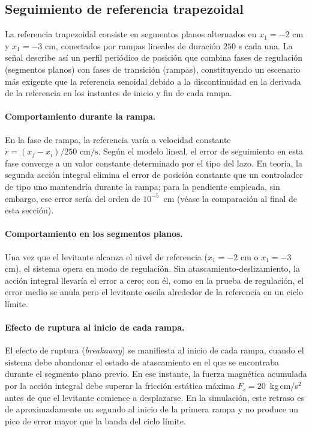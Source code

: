 \FloatBarrier

\subsection{Seguimiento de referencia trapezoidal}

La referencia trapezoidal consiste en segmentos planos alternados en $x_1 = -2$ cm y
$x_1 = -3$ cm, conectados por rampas lineales de duración $250$ s cada una.
La señal describe así un perfil periódico de posición que combina fases de regulación
(segmentos planos) con fases de transición (rampas), constituyendo un escenario más exigente
que la referencia senoidal debido a la discontinuidad en la derivada de la referencia en los
instantes de inicio y fin de cada rampa.

\paragraph{Comportamiento durante la rampa.}
En la fase de rampa, la referencia varía a velocidad constante
$\dot{r} = (x_{f}-x_{i})/250 \text{ cm/s}$.
Según el modelo lineal, el error de seguimiento en esta fase converge a un valor constante determinado por el tipo del lazo.
En teoría, la segunda acción integral elimina el error de posición constante que un controlador de tipo uno mantendría durante la rampa; para la pendiente empleada, sin embargo, ese error sería del orden de $10^{-5}$~cm (véase la comparación al final de esta sección).

\paragraph{Comportamiento en los segmentos planos.}
Una vez que el levitante alcanza el nivel de referencia ($x_1 = -2$ cm o $x_1 = -3$ cm),
el sistema opera en modo de regulación.
Sin atascamiento-deslizamiento, la acción integral llevaría el error a cero; con él, como en la prueba de regulación, el error medio se anula pero el levitante oscila alrededor de la referencia en un ciclo límite.

\paragraph{Efecto de ruptura al inicio de cada rampa.}
El efecto de ruptura (\emph{breakaway}) se manifiesta al inicio de cada
rampa, cuando el sistema debe abandonar el estado de atascamiento en el que se encontraba
durante el segmento plano previo.
En ese instante, la fuerza magnética acumulada por la acción integral debe superar la
fricción estática máxima $F_s = 20$~kg\,cm/s$^2$ antes de que el levitante comience a desplazarse.
En la simulación, este retraso es de aproximadamente un segundo al inicio de la primera rampa y no produce un pico de error mayor que la banda del ciclo límite.

